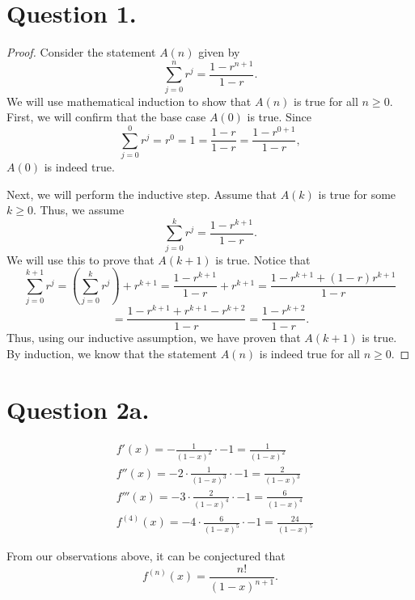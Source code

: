 \documentclass{article}
\begin{document}
\section*{Question 1.}
\begin{proof}
    Consider the statement $ A(n) $ given by
    \[
        \sum_{j=0}^n r^j = \frac{1 - r^{n + 1}}{1 - r}.
    \]
    We will use mathematical induction to show that $ A(n) $ is true for all $ n \geq 0 $. First, we will confirm that the base case $ A(0) $ is true. Since
    \[
        \sum_{j=0}^0 r^j = r^0 = 1 = \frac{1 - r}{1 - r} = \frac{1 - r^{0 + 1}}{1 - r},
    \]
    $ A(0) $ is indeed true.

    \noindent Next, we will perform the inductive step. Assume that $ A(k) $ is true for some $ k \geq 0 $. Thus, we assume
    \[
        \sum_{j=0}^k r^j = \frac{1 - r^{k + 1}}{1 - r}.
    \]
    We will use this to prove that $ A(k + 1) $ is true. Notice that
    \[
        \sum_{j=0}^{k+1} r^j = \left(\sum_{j=0}^k r^j\right) + r^{k+1} = \frac{1 - r^{k+1}}{1 - r} + r^{k+1} = \frac{1 - r^{k+1} + (1 - r)r^{k + 1}}{1 - r}
    \]
    \[
        = \frac{1 - r^{k+1} + r^{k+1} - r^{k+2}}{1 - r} = \frac{1 - r^{k+2}}{1 - r}.
    \]
    Thus, using our inductive assumption, we have proven that $ A(k+1) $ is true. By induction, we know that the statement $ A(n) $ is indeed true for all $ n \geq 0 $.
\end{proof}

\section*{Question 2a.}
\begin{align*}
    &f'(x) = -\frac{1}{(1 - x)^2} \cdot -1 = \frac{1}{(1 - x)^2} \\
    &f''(x) = -2 \cdot \frac{1}{(1 - x)^3} \cdot -1 = \frac{2}{(1 - x)^3} \\
    &f'''(x) = -3 \cdot \frac{2}{(1 - x)^4} \cdot -1 = \frac{6}{(1 - x)^4} \\
    &f^{(4)}(x) = -4 \cdot \frac{6}{(1 - x)^5} \cdot -1 = \frac{24}{(1 - x)^5}
\end{align*}

\noindent From our observations above, it can be conjectured that
\[
    f^{(n)}(x) = \frac{n!}{(1 - x)^{n + 1}}.
\]
\end{document}
